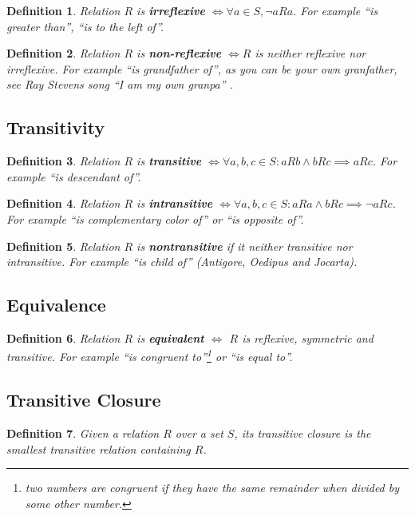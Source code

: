 \documentclass[11pt]{article}
\theoremstyle{plain}
\newtheorem{defn}{Definition}
\theoremstyle{definition}
\begin{document}
\begin{defn}
  Relation $R$ is \textbf{irreflexive} $\iff \forall a \in S, \neg aRa$.
  For example ``is greater than'', ``is to the left of''.
\end{defn}

\begin{defn}
  Relation $R$ is \textbf{non-reflexive} $\iff R$ is neither reflexive nor irreflexive.
  For example ``is grandfather of'', as you can be your own granfather,
  see Ray Stevens song ``I am my own granpa'' \smiley.
\end{defn}

\subsection{Transitivity}

\begin{defn}
  Relation $R$ is \textbf{transitive} $\iff \forall a, b, c \in S: aRb \land bRc \implies aRc$.
  For example ``is descendant of''.
\end{defn}

\begin{defn}
  Relation $R$ is \textbf{intransitive} $\iff \forall a, b, c \in S: aRa \land bRc \implies \neg aRc$.
  For example ``is complementary color of'' or ``is opposite of''.
\end{defn}

\begin{defn}
  Relation $R$ is \textbf{nontransitive} if it neither transitive nor intransitive.
  For example ``is child of'' (Antigore, Oedipus and Jocarta).
\end{defn}


\subsection{Equivalence}

\begin{defn}
  Relation $R$ is \textbf{equivalent} $\iff$ $R$ is reflexive, symmetric and transitive.
  For example ``is congruent to''\footnote{two numbers are congruent if they have the same remainder when divided by some other number.} or ``is equal to''.
\end{defn}

\subsection{Transitive Closure}

\begin{defn}
 Given a relation $R$ over a set $S$, its transitive closure is the smallest transitive relation containing $R$.
\end{defn}
\end{document}
